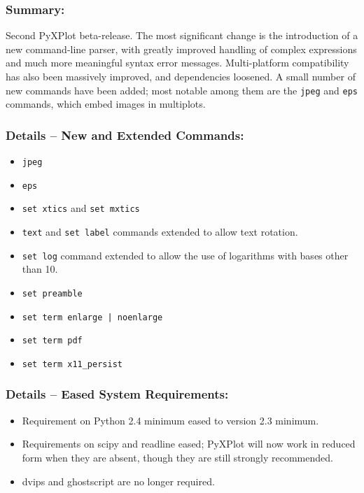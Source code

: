 \subsubsection*{Summary:}

Second PyXPlot beta-release. The most significant change is the introduction of
a new command-line parser, with greatly improved handling of complex
expressions and much more meaningful syntax error messages. Multi-platform
compatibility has also been massively improved, and dependencies loosened.  A
small number of new commands have been added; most notable among them are the
{\tt jpeg} and {\tt eps} commands, which embed images in multiplots.

\subsubsection*{Details -- New and Extended Commands:}

\begin{itemize}
\item {\tt jpeg}
\item {\tt eps}
\item {\tt set xtics} and {\tt set mxtics}
\item {\tt text} and {\tt set label} commands extended to allow text rotation.
\item {\tt set log} command extended to allow the use of logarithms with bases other than 10.
\item {\tt set preamble}
\item {\tt set term enlarge | noenlarge}
\item {\tt set term pdf}
\item {\tt set term x11\_persist}
\end{itemize}

\subsubsection*{Details -- Eased System Requirements:}

\begin{itemize}
\item Requirement on Python 2.4 minimum eased to version 2.3 minimum.
\item Requirements on scipy and readline eased; PyXPlot will now work in reduced form when they are absent, though they are still strongly recommended.
\item dvips and ghostscript are no longer required.
\end{itemize}

